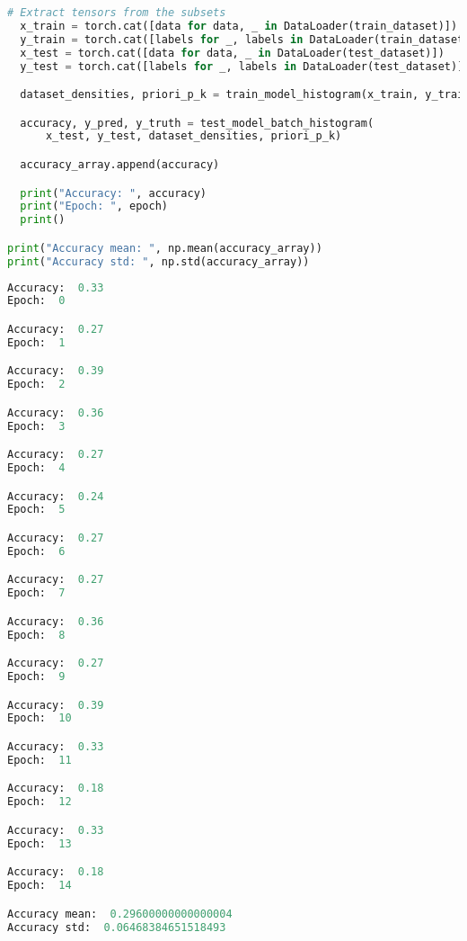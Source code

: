 \documentclass[spanish]{article}
\begin{document}
\begin{lstlisting}[language=Python, caption=Salida Pruba Modelo]
  # Extract tensors from the subsets
  x_train = torch.cat([data for data, _ in DataLoader(train_dataset)])
  y_train = torch.cat([labels for _, labels in DataLoader(train_dataset)])
  x_test = torch.cat([data for data, _ in DataLoader(test_dataset)])
  y_test = torch.cat([labels for _, labels in DataLoader(test_dataset)])

  dataset_densities, priori_p_k = train_model_histogram(x_train, y_train)

  accuracy, y_pred, y_truth = test_model_batch_histogram(
      x_test, y_test, dataset_densities, priori_p_k)

  accuracy_array.append(accuracy)

  print("Accuracy: ", accuracy)
  print("Epoch: ", epoch)
  print()

print("Accuracy mean: ", np.mean(accuracy_array))
print("Accuracy std: ", np.std(accuracy_array))

\end{lstlisting}

\begin{lstlisting}[language=Python, caption=Salida Pruba Modelo]
Accuracy:  0.33
Epoch:  0

Accuracy:  0.27
Epoch:  1

Accuracy:  0.39
Epoch:  2

Accuracy:  0.36
Epoch:  3

Accuracy:  0.27
Epoch:  4

Accuracy:  0.24
Epoch:  5

Accuracy:  0.27
Epoch:  6

Accuracy:  0.27
Epoch:  7

Accuracy:  0.36
Epoch:  8

Accuracy:  0.27
Epoch:  9

Accuracy:  0.39
Epoch:  10

Accuracy:  0.33
Epoch:  11

Accuracy:  0.18
Epoch:  12

Accuracy:  0.33
Epoch:  13

Accuracy:  0.18
Epoch:  14

Accuracy mean:  0.29600000000000004
Accuracy std:  0.06468384651518493

\end{lstlisting}
\end{document}
